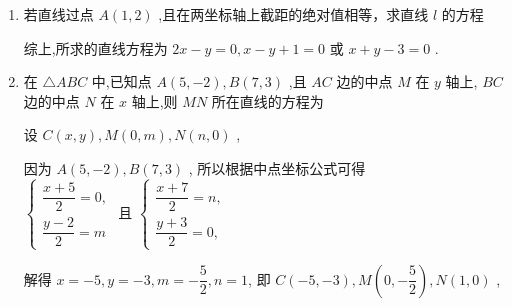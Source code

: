 \begin{enumerate}
\begin{enumerate}
\begin{jieda}
\begin{enumerate}
\begin{dingautolist}{172}
                \end{dingautolist}
                综上,所求直线方程为 $x - {2y} = 0$ 或 $x + {2y} - 4 = 0$ .
            \end{enumerate}
        \end{jieda}
        \item 若直线过点 $A\left( {1,2}\right)$ ,且在两坐标轴上截距的绝对值相等，求直线 $l$ 的方程
        \begin{jieda}
            综上,所求的直线方程为 ${2x} - y = 0,x - y + 1 = 0$ 或 $x + y - 3 = 0$ .
        \end{jieda}
        \item 在 $\bigtriangleup {ABC}$ 中,已知点 $A\left( {5, - 2}\right) ,B\left( {7,3}\right)$ ,且 ${AC}$ 边的中点 $M$ 在 $y$ 轴上, ${BC}$ 边的中点 $N$ 在 $x$ 轴上,则 ${MN}$ 所在直线的方程为
        \begin{jieda}
            设 $C\left( {x,y}\right) ,M\left( {0,m}\right) ,N\left( {n,0}\right)$ ,
            
            因为 $A\left( {5, - 2}\right) ,B\left( {7,3}\right)$ , 所以根据中点坐标公式可得 $\left\{  {\begin{array}{l} \dfrac{x + 5}{2} = 0, \\  \dfrac{y - 2}{2} = m \end{array}\text{ 且 }\left\{  \begin{array}{l} \dfrac{x + 7}{2} = n, \\  \dfrac{y + 3}{2} = 0, \end{array}\right. }\right.$
            
            解得 $x =  - 5,y =  - 3,m =  - \dfrac{5}{2},n = 1$, 即 $C\left( {-5, - 3}\right) ,M\left( {0, - \dfrac{5}{2}}\right) ,N\left( {1,0}\right)$ ,
            

\end{jieda}
\end{enumerate}
\end{enumerate}
